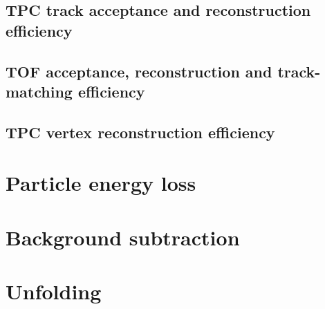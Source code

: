 \subsection{TPC track acceptance and reconstruction efficiency}\label{sec:tpcAccAndEff}
\subsection{TOF acceptance, reconstruction and track-matching efficiency}\label{sec:tofAccAndEff}
\subsection{TPC vertex reconstruction efficiency}\label{sec:tpcVxRecoEff}
\section{Particle energy loss}\label{sec:energyLoss}
\section{Background subtraction}\label{sec:bkgdSubtraction}
\section{Unfolding}\label{sec:unfolding}